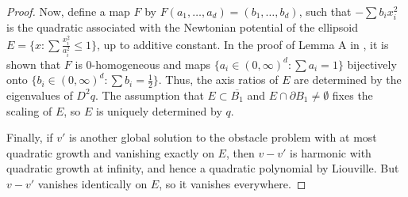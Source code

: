 \documentclass[11pt]{amsart}
\numberwithin{equation}{section}
\numberwithin{figure}{section}
\theoremstyle{plain}
\theoremstyle{definition}
\theoremstyle{remark}
\theoremstyle{plain}
\begin{document}
\begin{proof}
    Now, define a map $F$ by $F(a_1,\dots, a_d) = (b_1,\dots, b_d)$, such that $-\sum b_i x_i^2$ is the quadratic associated with the Newtonian potential of the ellipsoid $E = \{ x : \sum \frac{x_i^2}{a_i^2} \leq 1 \}$, up to additive constant. In the proof of Lemma A in \cite{KarpEllipsoid}, it is shown that $F$ is 0-homogeneous and maps $\{ a_i \in (0,\infty)^d : \sum a_i = 1\}$ bijectively onto $\{ b_i\in (0,\infty)^d : \sum b_i = \frac{1}{2}\}$. Thus, the axis ratios of $E$ are determined by the eigenvalues of $D^2 q$. The assumption that $E\subset \overline{B_1}$ and $E\cap \partial B_1\neq \emptyset$ fixes the scaling of $E$, so $E$ is uniquely determined by $q$.

Finally, if $v'$ is another global solution to the obstacle problem with at most quadratic growth and vanishing exactly on $E$, then $v - v'$ is harmonic with quadratic growth at infinity, and hence a quadratic polynomial by Liouville. But $v - v'$ vanishes identically on $E$, so it vanishes everywhere.

\end{proof}


\renewcommand{\bibliofont}{\small\setlength{\baselineskip}{10pt}}


\end{document}
